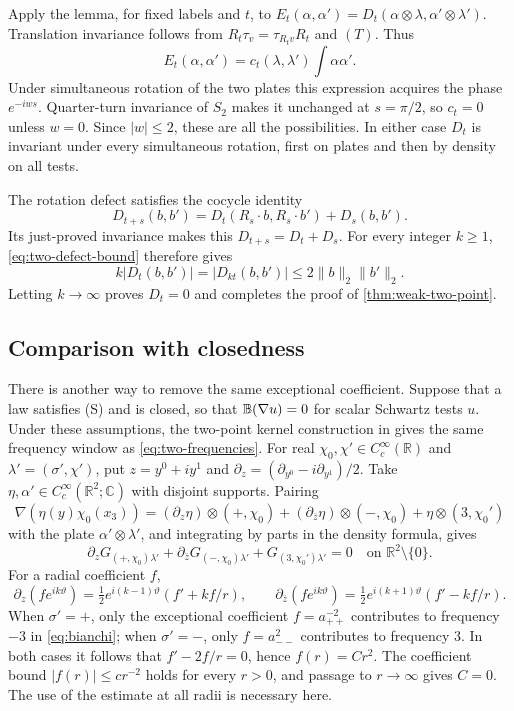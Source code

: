 \documentclass[11pt,letterpaper,reqno]{amsart}
\theoremstyle{definition}
\theoremstyle{remark}
\newcommand{\R}{\mathbb R}\newcommand{\C}{\mathbb C}
\begin{document}
Apply the lemma, for fixed labels and $t$, to
$E_t(\alpha,\alpha')=D_t(\alpha\otimes\lambda,
\alpha'\otimes\lambda')$. Translation invariance follows from
$R_t\tau_v=\tau_{R_tv}R_t$ and $(T)$. Thus
\[
 E_t(\alpha,\alpha')=c_t(\lambda,\lambda')\int\alpha\alpha'.
\]
Under simultaneous rotation of the two plates this expression acquires
the phase $e^{-iws}$. Quarter-turn invariance of $S_2$ makes it
unchanged at $s=\pi/2$, so $c_t=0$ unless $w=0$. Since $|w|\le2$,
these are all the possibilities. In either case $D_t$ is invariant
under every simultaneous rotation, first on plates and then by density
on all tests.

The rotation defect satisfies the cocycle identity
\[
 D_{t+s}(b,b')=D_t(R_s\cdot b,R_s\cdot b')+D_s(b,b').
\]
Its just-proved invariance makes this $D_{t+s}=D_t+D_s$. For every
integer $k\ge1$, \eqref{eq:two-defect-bound} therefore gives
\[
 k|D_t(b,b')|=|D_{kt}(b,b')|\le2\|b\|_2\|b'\|_2.
\]
Letting $k\to\infty$ proves $D_t=0$ and completes the proof of
\cref{thm:weak-two-point}.

\subsection{Comparison with closedness}

There is another way to remove the same exceptional coefficient.
Suppose that a law satisfies \textup{(S)} and is closed, so that
$\mathbb B(\nabla u)=0$ for scalar Schwartz tests $u$. Under these assumptions,
the two-point kernel construction in
\cite[Section~8.5]{QEDCurrent} gives the same frequency window as
\eqref{eq:two-frequencies}.
For real $\chi_0,\chi'\in C_c^\infty(\R)$ and
$\lambda'=(\sigma',\chi')$, put
$z=y^0+iy^1$ and
$\partial_z=(\partial_{y^0}-i\partial_{y^1})/2$.
Take $\eta,\alpha'\in C_c^\infty(\R^2;\C)$ with disjoint supports.
Pairing
\[
 \nabla(\eta(y)\chi_0(x_3))
   =(\partial_z\eta)\otimes(+,\chi_0)
      +(\partial_{\bar z}\eta)\otimes(-,\chi_0)
      +\eta\otimes(3,\chi_0')
\]
with the plate $\alpha'\otimes\lambda'$, and integrating by
parts in the density formula, gives
\begin{equation}\label{eq:bianchi}
 \partial_zG_{(+,\chi_0)\lambda'}
 +\partial_{\bar z}G_{(-,\chi_0)\lambda'}
 +G_{(3,\chi_0')\lambda'}=0
 \quad\text{on }\R^2\setminus\{0\}.
\end{equation}
For a radial coefficient $f$,
\[
 \partial_z(fe^{ik\vartheta})
   =\tfrac12e^{i(k-1)\vartheta}(f'+kf/r),\qquad
 \partial_{\bar z}(fe^{ik\vartheta})
   =\tfrac12e^{i(k+1)\vartheta}(f'-kf/r).
\]
When $\sigma'=+$, only the exceptional coefficient
$f=a^{-2}_{++}$ contributes to frequency $-3$ in
\eqref{eq:bianchi}; when $\sigma'=-$, only $f=a^2_{--}$
contributes to frequency $3$. In both cases it follows that
$f'-2f/r=0$, hence $f(r)=Cr^2$. The coefficient bound
$|f(r)|\le c r^{-2}$ holds for every $r>0$, and passage to
$r\to\infty$ gives $C=0$. The use of the estimate at all radii
is necessary here.
\end{document}
